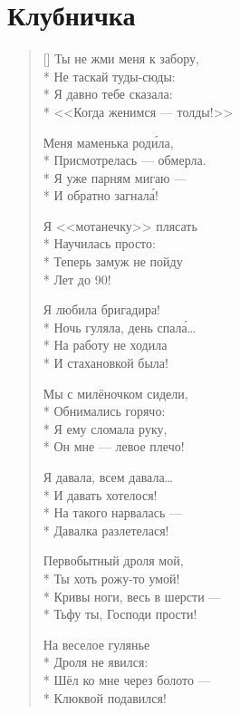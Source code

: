 \documentclass[a4paper,oneside,14pt]{scrbook}
\begin{document}
    
    \section{Клубничка}
    
    \settowidth{\versewidth}{Ты не жми меня к забору,}
    \begin{verse}[\versewidth]
        Ты не жми меня к забору,\\*
        Не таскай туды-сюды:\\*
        Я давно тебе сказала:\\*
        <<Когда женимся --- толды!>>
        
        Меня маменька род\'{и}ла,\\*
        Присмотрелась --- обмерла.\\*
        Я уже парням мигаю --- \\*
        И обратно загнал\'{а}!
        
        Я <<мотанечку>> плясать\\*
        Научилась просто:\\*
        Теперь замуж не пойду\\*
        Лет до 90!
        
        Я любила бригадира!\\*
        Ночь гуляла, день спал\'{а}\ldots\\*
        На работу не ходила\\*
        И стахановкой была!
        
        Мы с милёночком сидели,\\*
        Обнимались горячо:\\*
        Я ему сломала руку, \\*
        Он мне --- левое плечо!
        
        Я давала, всем  давала\ldots\\*
        И давать хотелося!\\*
        На такого нарвалась --- \\*
        Давалка разлетелася!
        
        Первобытный дроля мой,\\*
        Ты хоть рожу-то умой!\\*
        Кривы ноги, весь в шерсти --- \\*
        Тьфу ты, Господи прости!
        
        На веселое гулянье\\*
        Дроля не явился:\\*
        Шёл ко мне через болото ---\\*
        Клюквой подавился!
        

\end{verse}
\end{document}
